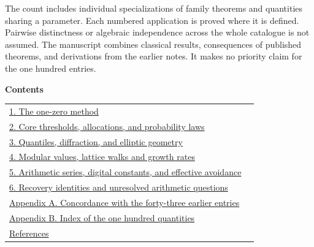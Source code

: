 \documentclass[11pt,a4paper]{article}
\theoremstyle{definition}
\theoremstyle{remark}
\begin{document}
\vspace{.2em}
\noindent The count includes individual specializations of family theorems and quantities sharing a parameter. Each numbered application is proved where it is defined. Pairwise distinctness or algebraic independence across the whole catalogue is not assumed. The manuscript combines classical results, consequences of published theorems, and derivations from the earlier notes. It makes no priority claim for the one hundred entries.
\par\vspace{.85em}
\noindent\textbf{Contents}\par\smallskip
\noindent\begin{tabularx}{\textwidth}{@{}Xr@{}}
\hyperref[sec:method]{1. The one-zero method} & \pageref{sec:method}\\
\hyperref[sec:graph]{2. Core thresholds, allocations, and probability laws} & \pageref{sec:graph}\\
\hyperref[sec:analytic]{3. Quantiles, diffraction, and elliptic geometry} & \pageref{sec:analytic}\\
\hyperref[sec:mcat]{4. Modular values, lattice walks and growth rates} & \pageref{sec:mcat}\\
\hyperref[sec:arith]{5. Arithmetic series, digital constants, and effective avoidance} & \pageref{sec:arith}\\
\hyperref[sec:open]{6. Recovery identities and unresolved arithmetic questions} & \pageref{sec:open}\\
\hyperref[sec:archive]{Appendix A. Concordance with the forty-three earlier entries} & \pageref{sec:archive}\\
\hyperref[sec:directory]{Appendix B. Index of the one hundred quantities} & \pageref{sec:directory}\\
\hyperref[sec:ref]{References} & \pageref{sec:ref}
\end{tabularx}
\newpage
\end{document}
